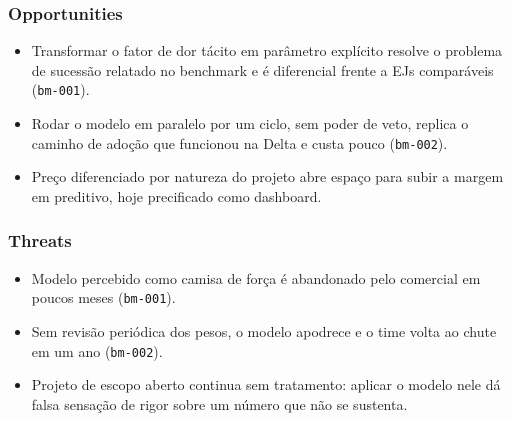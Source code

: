 \subsubsection{Opportunities}

\begin{itemize}
  \item Transformar o fator de dor tácito em parâmetro explícito resolve o problema de sucessão relatado no benchmark e é diferencial frente a EJs comparáveis (\texttt{bm-001}).
  \item Rodar o modelo em paralelo por um ciclo, sem poder de veto, replica o caminho de adoção que funcionou na Delta e custa pouco (\texttt{bm-002}).
  \item Preço diferenciado por natureza do projeto abre espaço para subir a margem em preditivo, hoje precificado como dashboard.
\end{itemize}

\subsubsection{Threats}

\begin{itemize}
  \item Modelo percebido como camisa de força é abandonado pelo comercial em poucos meses (\texttt{bm-001}).
  \item Sem revisão periódica dos pesos, o modelo apodrece e o time volta ao chute em um ano (\texttt{bm-002}).
  \item Projeto de escopo aberto continua sem tratamento: aplicar o modelo nele dá falsa sensação de rigor sobre um número que não se sustenta.
\end{itemize}

